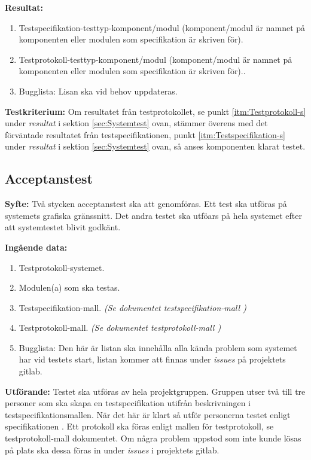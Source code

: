 \documentclass[a4paper,10pt]{article}
\begin{document}
\textbf{Resultat:}
    \begin{enumerate}
        \item \label{itm:Testspecifikation-s} Testspecifikation-testtyp-komponent/modul (komponent/modul är namnet på komponenten eller modulen som specifikation är skriven för).
        \item \label{itm:Testprotokoll-s} Testprotokoll-testtyp-komponent/modul (komponent/modul är namnet på komponenten eller modulen som specifikation är skriven för)..
        \item Bugglista: Lisan ska vid behov uppdateras.
    \end{enumerate}

\textbf{Testkriterium:} Om resultatet från testprotokollet, se punkt \ref{itm:Testprotokoll-s} under \emph{resultat} i sektion \ref{sec:Systemtest} ovan, stämmer överens med det förväntade resultatet från testspecifikationen, punkt \ref{itm:Testspecifikation-s} under \emph{resultat} i sektion \ref{sec:Systemtest} ovan, så anses komponenten klarat testet.

\subsection{Acceptanstest}
\textbf{Syfte:}
Två stycken acceptanstest ska att genomföras. Ett test ska utföras på systemets grafiska gränssnitt.  Det andra testet ska utföars på hela systemet efter att systemtestet blivit godkänt.

\textbf{Ingående data:}
        \begin{enumerate}
            \item Testprotokoll-systemet.
            \item Modulen(a) som ska testas.
            \item Testspecifikation-mall. \emph{(Se dokumentet testspecifikation-mall \cite{testspec-mall})}
            \item Testprotokoll-mall. \emph{(Se dokumentet testprotokoll-mall \cite{testprot-mall})}
            \item Bugglista: Den här är listan ska innehålla alla kända problem som systemet har vid testets start, listan kommer att finnas under \emph{issues} på projektets gitlab.
        \end{enumerate}

\textbf{Utförande:} Testet ska utföras av hela projektgruppen. Gruppen utser två till tre personer som ska skapa en testspecifikation utifrån beskrivningen i testspecifikationsmallen. När det här är klart så utför personerna testet enligt specifikationen \cite{kravspec}. Ett protokoll ska föras enligt mallen för testprotokoll, se testprotokoll-mall dokumentet. Om några problem uppstod som inte kunde lösas på plats ska dessa föras in under \emph{issues} i projektets gitlab.
\end{document}
